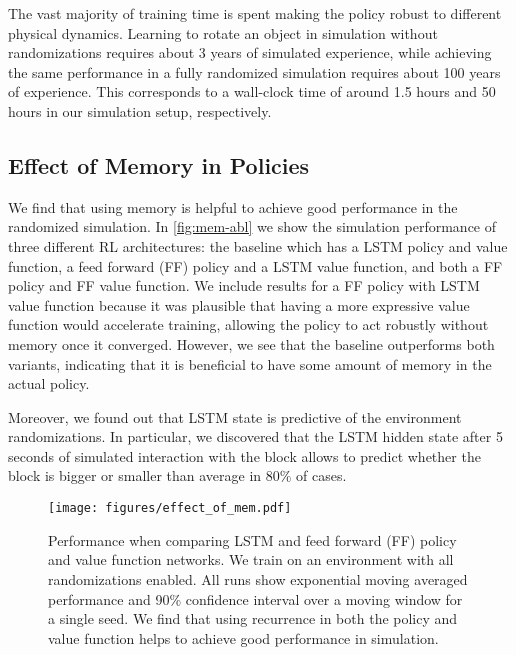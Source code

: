 The vast majority of training time is spent making the policy robust to different physical dynamics. Learning to rotate an object in simulation without randomizations requires about 3 years of simulated experience, while achieving the same performance in a fully randomized simulation requires about 100 years of experience.
This corresponds to a wall-clock time of around 1.5 hours and 50 hours in our simulation setup, respectively.



\subsection{Effect of Memory in Policies}

We find that using memory is helpful to achieve good performance in the randomized simulation. In \autoref{fig:mem-abl} we show the simulation performance of three different RL architectures: the baseline which has a LSTM policy and value function, a feed forward (FF) policy and a LSTM value function, and both a  FF policy and FF value function. We include results for a FF policy with LSTM value function because it was plausible that having a more expressive value function would accelerate training, allowing the policy to act robustly without memory once it converged. However, we see that the baseline outperforms both variants, indicating that it is beneficial to have some amount of memory in the actual policy.

Moreover, we found out that LSTM state is predictive of the environment randomizations.
In particular, we discovered that the LSTM hidden state after 5 seconds of simulated interaction
with the block allows to predict whether the block is bigger or smaller than
average in $80\%$ of cases.

\begin{figure}[h]
    \begin{minipage}[c]{0.55\textwidth}
        \texttt{[image: figures/effect\_of\_mem.pdf]}
    \end{minipage}\hfill
    \begin{minipage}[c]{0.45\textwidth}
        \caption{Performance when comparing LSTM and feed forward (FF) policy and value function networks. We train on an environment with all randomizations enabled. All runs show exponential moving averaged performance and 90\% confidence interval over a moving window for a single seed. We find that using recurrence in both the policy and value function helps to achieve good performance in simulation.
        }
        \label{fig:mem-abl}
    \end{minipage}\hfill
\end{figure}


